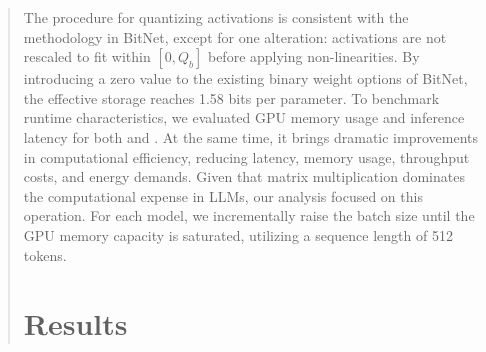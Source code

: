\begin{abstract}
\begin{itemize}
The procedure for quantizing activations is consistent with the methodology in BitNet, except for one alteration: activations are not rescaled to fit within $[0, Q_b]$ before applying non-linearities. By introducing a zero value to the existing binary weight options of BitNet, the effective storage reaches 1.58 bits per parameter. To benchmark runtime characteristics, we evaluated GPU memory usage and inference latency for both  and . At the same time, it brings dramatic improvements in computational efficiency, reducing latency, memory usage, throughput costs, and energy demands. Given that matrix multiplication dominates the computational expense in LLMs, our analysis focused on this operation. For each model, we incrementally raise the batch size until the GPU memory capacity is saturated, utilizing a sequence length of 512 tokens. \section{Results}


\end{itemize}
\end{abstract}
